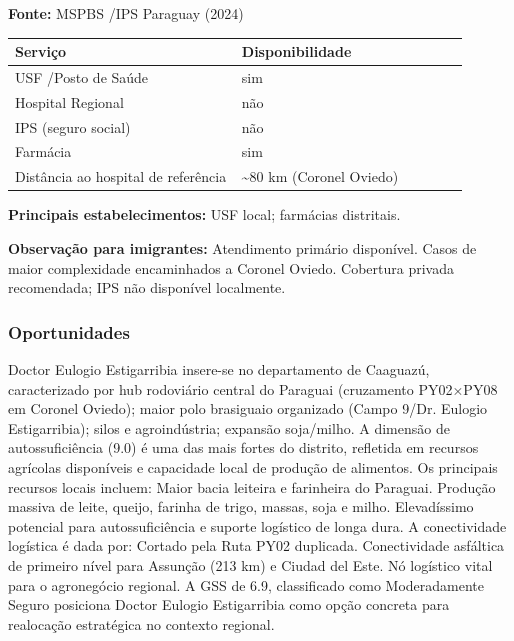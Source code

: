 \textbf{Fonte:} MSPBS /\allowbreak  IPS Paraguay (2024)

{\def\LTcaptype{none} %
\begin{longtable}{@{}>{\raggedright\arraybackslash}p{0.45\linewidth} >{\raggedright\arraybackslash}p{0.45\linewidth}@{}}
\toprule\noalign{}
Serviço & Disponibilidade \\
\midrule\noalign{}
\endhead
\bottomrule\noalign{}
\endlastfoot
USF /\allowbreak  Posto de Saúde & sim \\
Hospital Regional & não \\
IPS (seguro social) & não \\
Farmácia & sim \\
Distância ao hospital de referência & \textasciitilde80 km (Coronel
Oviedo) \\
\end{longtable}
}

\textbf{Principais estabelecimentos:} USF local; farmácias distritais.

\textbf{Observação para imigrantes:} Atendimento primário disponível.
Casos de maior complexidade encaminhados a Coronel Oviedo. Cobertura
privada recomendada; IPS não disponível localmente.
\newpage

\subsubsection*{Oportunidades}\label{oport-doctor-eulogio-estigarribia-0506}
Doctor Eulogio Estigarribia insere-se no departamento de Caaguazú, caracterizado por hub rodoviário central do Paraguai (cruzamento PY02×PY08 em Coronel Oviedo); maior polo brasiguaio organizado (Campo 9/Dr. Eulogio Estigarribia); silos e agroindústria; expansão soja/milho. A dimensão de autossuficiência (9.0) é uma das mais fortes do distrito, refletida em recursos agrícolas disponíveis e capacidade local de produção de alimentos. Os principais recursos locais incluem: Maior bacia leiteira e farinheira do Paraguai. Produção massiva de leite, queijo, farinha de trigo, massas, soja e milho. Elevadíssimo potencial para autossuficiência e suporte logístico de longa dura. A conectividade logística é dada por: Cortado pela Ruta PY02 duplicada. Conectividade asfáltica de primeiro nível para Assunção (213 km) e Ciudad del Este. Nó logístico vital para o agronegócio regional. A GSS de 6.9, classificado como Moderadamente Seguro posiciona Doctor Eulogio Estigarribia como opção concreta para realocação estratégica no contexto regional.

